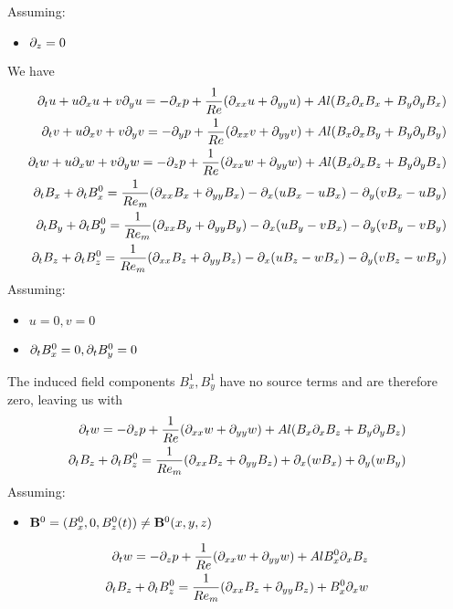 \documentclass[11pt]{article}
\begin{document}
Assuming:
\begin{itemize}\setlength\itemsep{-1em}
	\item $\partial_z=0$
\end{itemize}
We have
\begin{equation}\begin{aligned}
\partial_t u+ u\partial_x u + v\partial_y u = -\partial_x p+ \frac{1}{Re} (\partial_{xx}u+\partial_{yy}u) + Al (B_x \partial_x B_x + B_y \partial_y B_x) \\
\partial_t v+ u\partial_x v + v\partial_y v = -\partial_y p+ \frac{1}{Re} (\partial_{xx}v+\partial_{yy}v) + Al (B_x \partial_x B_y + B_y \partial_y B_y) \\
\partial_t w+ u\partial_x w + v\partial_y w = -\partial_z p+ \frac{1}{Re} (\partial_{xx}w+\partial_{yy}w) + Al (B_x \partial_x B_z + B_y \partial_y B_z) \\
\partial_t B_x + \partial_t B_x^0 = \frac{1}{Re_m} (\partial_{xx} B_x + \partial_{yy} B_x) - \partial_x (u B_x - u B_x) - \partial_y (v B_x - u B_y) \\
\partial_t B_y + \partial_t B_y^0 = \frac{1}{Re_m} (\partial_{xx} B_y + \partial_{yy} B_y) - \partial_x (u B_y - v B_x) - \partial_y (v B_y - v B_y) \\
\partial_t B_z + \partial_t B_z^0 = \frac{1}{Re_m} (\partial_{xx} B_z + \partial_{yy} B_z) - \partial_x (u B_z - w B_x) - \partial_y (v B_z - w B_y) \\
\end{aligned} \end{equation}
Assuming:
\begin{itemize}\setlength\itemsep{-1em}
	\item $u=0,v=0$
	\item $\partial_t B_x^0 = 0, \partial_t B_y^0 = 0$
\end{itemize}
The induced field components $B_x^1,B_y^1$ have no source terms and are therefore zero, leaving us with
\begin{equation}\begin{aligned}
\partial_t w = -\partial_z p+ \frac{1}{Re} (\partial_{xx}w+\partial_{yy}w) + Al (B_x \partial_x B_z + B_y \partial_y B_z) \\
\partial_t B_z + \partial_t B_z^0 = \frac{1}{Re_m} (\partial_{xx} B_z + \partial_{yy} B_z) + \partial_x (w B_x) + \partial_y (w B_y) \\
\end{aligned} \end{equation}
Assuming:
\begin{itemize}\setlength\itemsep{-1em}
	\item $\mathbf{B}^0 = (B_x^0,0,B_z^0(t)) \ne \mathbf{B}^0(x,y,z)$
\end{itemize}
\begin{equation}\begin{aligned}
\partial_t w = -\partial_z p+ \frac{1}{Re} (\partial_{xx}w+\partial_{yy}w) + Al B_x^0 \partial_x B_z \\
\partial_t B_z + \partial_t B_z^0 = \frac{1}{Re_m} (\partial_{xx} B_z + \partial_{yy} B_z) + B_x^0 \partial_x w \\
\end{aligned} \end{equation}
\end{document}
